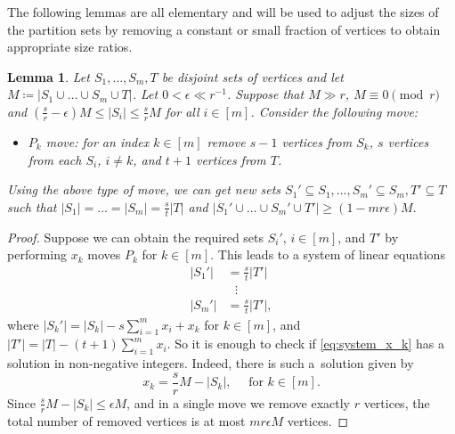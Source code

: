 \documentclass[reqno, 12pt]{amsart}
\numberwithin{equation}{section}
\numberwithin{figure}{section}
\theoremstyle{plain}
\newtheorem{lemma}[thm]{Lemma}
\theoremstyle{definition}
\begin{document}
    The following lemmas are all elementary and will be used to adjust the sizes of the partition sets by removing a constant or small fraction of vertices to obtain appropriate size ratios. 
    
    \begin{lemma}\label{l:equalize-(m+1)-tuples-to-s/t}
        Let $S_1,\dots , S_m , T$ be disjoint sets of vertices and let $M\coloneq |S_1\cup\dots\cup S_m\cup T|$. Let $0<\epsilon\ll r^{-1}$. Suppose that $M\gg r$, $M\equiv 0 \pmod{r}$ and $\left(\frac{s}{r}-\epsilon\right) M\leq|S_i|\leq \frac{s}{r}M$ for all $i\in [m]$.
        Consider the following move:
        \begin{itemize}
            \item $P_k$ move: for an index $k\in [m]$ remove $s-1$ vertices from $S_k$, $s$ vertices from each $S_i$, $i\neq k$, and $t+1$ vertices from $T$.
        \end{itemize}   
        Using the above type of move, we can get new sets $S_1'\subseteq S_1,\dots,S_m'\subseteq S_m,T'\subseteq T$ such that $|S_1|=\dots =|S_m|=\frac{s}{t}|T|$ and $|S_1'\cup\dots\cup S_m'\cup T'|\geq (1-mr\epsilon)M.$
    \end{lemma}

    \begin{proof}
        Suppose we can obtain the required sets $S_i'$, $i\in[m]$, and $T'$ by performing $x_k$ moves $P_k$ for $k\in[m]$. This leads to a system of linear equations
        \begin{align}\label{eq:system_x_k}
            |S_1'|&=\frac{s}{t}|T'| \nonumber\\
            &\,\,\,\,\vdots \\
            |S_m'|&=\frac{s}{t}|T'|, \nonumber
        \end{align}
        where $|S_k'|=|S_k|-s\sum_{i=1}^m x_i+x_k$ for $k\in[m]$, and $|T'|=|T|-(t+1)\sum_{i=1}^m x_i$. So it is enough to check if \eqref{eq:system_x_k} has a solution in non-negative integers. Indeed, there is such a~solution given by
        \[x_k=\frac{s}{r}M-|S_k|, \quad \text{ for }k\in[m].\] Since $\frac{s}{r}M-|S_k|\leq \epsilon M$, and in a single move we remove exactly $r$ vertices, the total number of removed vertices is at most $mr\epsilon M$ vertices.
    \end{proof}
\end{document}
